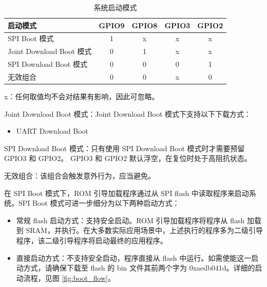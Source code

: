 \documentclass[main\_\_CN.tex]{subfiles}
\begin{document}
\begin{table}[H]
    \centering
\caption{系统启动模式}
\label{tab:bootctrl-boot-mode-control}
\begin{threeparttable}
    \begin{tabular}{ | p{5cm} | c | c | c |c| }
    \hline
    \rowcolor{lightgray}
  \textbf{启动模式} & \textbf{GPIO9} & \textbf{GPIO8} & \textbf{GPIO3} & \textbf{GPIO2}\\ \hline
  SPI Boot 模式 & 1 & x\tnote{1} & x & x \\ \hline
  Joint Download Boot 模式\tnote{2} & 0 & 1 & x & x\\ \hline
  SPI Download Boot 模式\tnote{3} & 0 & 0 & 0 & 1 \\ \hline
  无效组合\tnote{4} & 0 & 0  & x & 0 \\ \hline
\end{tabular}

\begin{tablenotes}
            \item[1] x：任何取值均不会对结果有影响，因此可忽略。
            \item[2] Joint Download Boot 模式：Joint Download Boot 模式下支持以下下载方式：
            \begin{itemize}
                \item UART Download Boot
            \end{itemize}
            \item[3] SPI Download Boot 模式：只有使用 SPI Download Boot 模式时才需要预留 GPIO3 和 GPIO2。 GPIO3 和 GPIO2 默认浮空，在复位时处于高阻抗状态。
            \item[4] 无效组合：该组合会触发意外行为，应当避免。
        \end{tablenotes}
     \end{threeparttable}
\end{table}



在 SPI Boot 模式下，ROM 引导加载程序通过从 SPI flash 中读取程序来启动系统。SPI Boot 模式可进一步细分为以下两种启动方式：
\begin{itemize}
    \item 常规 flash 启动方式：支持安全启动。ROM 引导加载程序将程序从 flash 加载到 SRAM，并执行。在大多数实际应用场景中，上述执行的程序多为二级引导程序，该二级引导程序将启动最终的应用程序。
    \item 直接启动方式：不支持安全启动，程序直接从 flash 中运行。如需使能这一启动方式，请确保下载至 flash 的 bin 文件其前两个字为 0xaedb041d。详细的启动流程，见图 \ref{fig:boot_flow}。
\end{itemize}
\end{document}
